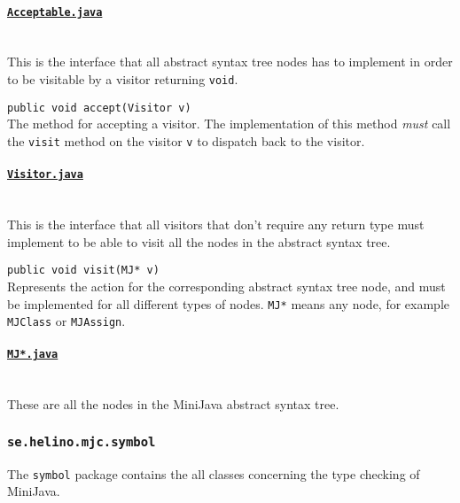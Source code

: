 \documentclass[11pt,oneside,a4paper]{article}
\newcommand{\code}[1]{\texttt{#1}}
\newcommand{\class}[1]{\underline{\texttt{#1}}}
\begin{document}
\paragraph{\class{Acceptable.java}} \hfill \\
This is the interface that all abstract syntax tree nodes has to implement in
order to be visitable by a visitor returning \code{void}.
\begin{description}
    \item{\code{public void accept(Visitor v)}} \hfill \\
        The method for accepting a visitor. The implementation of this method 
        \emph{must} call the
        \code{visit} method on the visitor \code{v} to dispatch back to the
        visitor. 
\end{description}


\paragraph{\class{Visitor.java}} \hfill \\
This is the interface that all visitors that don't require any return type
must implement to be able to visit all the nodes in the abstract syntax tree.
\begin{description}
    \item{\code{public void visit(MJ* v)}} \hfill \\
        Represents the action for the corresponding abstract
        syntax tree node, and must be implemented for all different types of 
        nodes.  \code{MJ*} means any node, for example \code{MJClass} or
        \code{MJAssign}.
\end{description}

\paragraph{\class{MJ*.java}} \hfill \\
These are all the nodes in the MiniJava abstract syntax tree.

\subsubsection{\code{se.helino.mjc.symbol}}
The \code{symbol} package contains the all classes concerning the type
checking of MiniJava.
\end{document}
